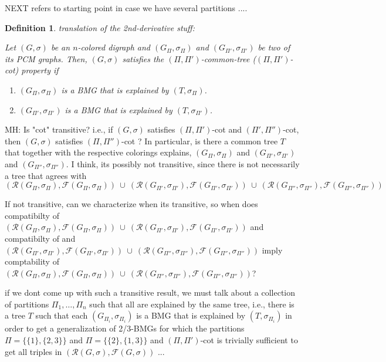 \documentclass[final,3p,times]{elsarticle}
\newtheorem{definition}{Definition}[section]
\newcommand{\TODO}[1]{\begingroup\color{red}#1\endgroup}
\begin{document}
\TODO{\bigskip \bigskip NEXT refers to starting point in case we have several partitions .... }
\begin{definition}\TODO{translation of the 2nd-derivative stuff:}

Let $(G,\sigma)$ be an $n$-colored digraph 
and $(G_{\Pi},\sigma_{\Pi})$ and $(G_{\Pi'},\sigma_{\Pi'})$ 
be two of its PCM graphs. 
Then, $(G,\sigma)$ satisfies the $(\Pi,\Pi')$-common-tree ($(\Pi,\Pi')$-cot) property
if 
\begin{enumerate}
	\item $(G_{\Pi},\sigma_{\Pi})$ is a BMG that is explained by $(T,\sigma_{\Pi})$.
	\item $(G_{\Pi'},\sigma_{\Pi'})$ is a BMG that is explained by $(T,\sigma_{\Pi'})$.
\end{enumerate}
\end{definition}

\TODO{MH: Is "cot" transitive? i.e., if $(G,\sigma)$ satisfies $(\Pi,\Pi')$-cot and $(\Pi',\Pi'')$-cot, then 
		$(G,\sigma)$ satisfies $(\Pi,\Pi'')$-cot ? In particular, 
		is there a common tree $T$ that together with the respective colorings explains, 
		$(G_{\Pi},\sigma_{\Pi})$ 
		and $(G_{\Pi'},\sigma_{\Pi'})$ and
		$(G_{\Pi''},\sigma_{\Pi''})$. I think, its possibly not transitive,  since
		there is not necessarily a tree that agrees with
		$$(\mathscr{R}(G_{\Pi},\sigma_{\Pi}),\mathscr{F}(G_{\Pi},\sigma_{\Pi}))\ \cup\ 
		(\mathscr{R}(G_{\Pi'},\sigma_{\Pi'}),\mathscr{F}(G_{\Pi'},\sigma_{\Pi'}))\ \cup\ 
		(\mathscr{R}(G_{\Pi''},\sigma_{\Pi''}),\mathscr{F}(G_{\Pi''},\sigma_{\Pi''}))$$
		


If not transitive, can we characterize when its transitive, so when 
does compatibilty of  $(\mathscr{R}(G_{\Pi},\sigma_{\Pi}),\mathscr{F}(G_{\Pi},\sigma_{\Pi}))\ \cup\ 
		(\mathscr{R}(G_{\Pi'},\sigma_{\Pi'}),\mathscr{F}(G_{\Pi'},\sigma_{\Pi'}))$
		and compatibilty of 
		and $
		(\mathscr{R}(G_{\Pi'},\sigma_{\Pi'}),\mathscr{F}(G_{\Pi'},\sigma_{\Pi'}))\ \cup\ 
		(\mathscr{R}(G_{\Pi''},\sigma_{\Pi''}),\mathscr{F}(G_{\Pi''},\sigma_{\Pi''}))$
		imply comptability of 
		$(\mathscr{R}(G_{\Pi},\sigma_{\Pi}),\mathscr{F}(G_{\Pi},\sigma_{\Pi}))\ \cup\ 
		(\mathscr{R}(G_{\Pi''},\sigma_{\Pi''}),\mathscr{F}(G_{\Pi''},\sigma_{\Pi''}))$?
		

if we dont come up with such a transitive result, 
we must talk about a collection of partitions $\Pi_1,\dots,\Pi_n$
such that all are explained by the same tree, i.e.,  there is a tree $T$ such
that each $(G_{\Pi_i},\sigma_{\Pi_i})$ is a BMG that is explained by $(T,\sigma_{\Pi_i})$
in order to get a generalization of 2/3-BMGs for which 
the partitions $\Pi = \{\{1\}, \{2,3\}\}$ and  $\Pi = \{\{2\}, \{1,3\}\}$ 
and $(\Pi,\Pi')$-cot is trivially sufficient to get all triples
in $(\mathscr{R}(G,\sigma),\mathscr{F}(G,\sigma))$ ... 
}	 
	 
\end{document}
